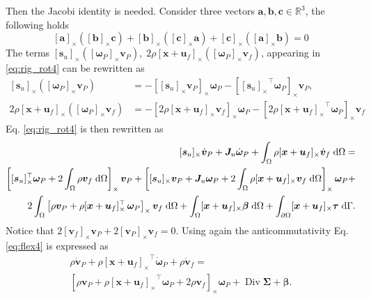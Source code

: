 \documentclass{svjour3}                     %
\DeclareMathOperator*{\Div}{Div}
\newcommand{\crmat}[1]{\ensuremath{[#1]_{\times}}}
\begin{document}
Then the Jacobi identity is needed. Consider three vectors $\bm{a}, \bm{b}, \bm{c} \in \mathbb{R}^3$, the following holds
\begin{equation}
\crmat{\bm{a}} (\crmat{\bm{b}} \bm{c}) + \crmat{\bm{b}} (\crmat{\bm{c}} \bm{a}) + \crmat{\bm{c}} (\crmat{\bm{a}} \bm{b}) = 0
\end{equation}
The terms $\crmat{\bm{s}_u} (\crmat{\bm{\omega}_P} \bm{v}_P), \; 2\rho \crmat{\bm{x}+\bm{u}_f} (\crmat{\bm\omega_P} {\bm{v}}_f)$, appearing in \eqref{eq:rig_rot4} can be rewritten as
\begin{align}
	\crmat{\bm{s}_u} (\crmat{\bm{\omega}_P} \bm{v}_P) &= - \crmat{\crmat{\bm{s}_u} \bm{v}_P} \bm{\omega}_P - \crmat{\crmat{\bm{s}_u}^\top \bm{\omega}_P} \bm{v}_P, \\
	2\rho \crmat{\bm{x}+\bm{u}_f} (\crmat{\bm\omega_P} {\bm{v}}_f) &= - \crmat{2\rho \crmat{\bm{x}+\bm{u}_f} \bm{v}_f} \bm\omega_P - \crmat{2\rho \crmat{\bm{x}+\bm{u}_f}^\top \bm\omega_P} \bm{v}_f
\end{align}
Eq. \eqref{eq:rig_rot4} is then rewritten as
\begin{equation}
\label{eq:rig_rot5}
\begin{split}
\crmat{\bm{s}_u} \dot{\bm{v}}_P  + \bm{J}_u \dot{\bm\omega}_P + \int_{\Omega} \rho \crmat{\bm{x}+\bm{u}_f} \dot{\bm{v}}_f \d{\Omega} = \\
\left[\crmat{\bm{s}_u}^\top \bm\omega_P + 2 \int_{\Omega} \rho \bm{v}_f \d{\Omega} \right]_\times \bm{v}_P + \left[\crmat{\bm{s}_u} \bm{v}_P + \bm{J}_u \bm\omega_P + 2 \int_{\Omega} \rho \crmat{\bm{x}+\bm{u}_f} {\bm{v}}_f \d{\Omega} \right]_\times \bm\omega_P + 
\\
2 \int_{\Omega} \left[\rho \bm{v}_P + \rho \crmat{\bm{x}+\bm{u}_f}^\top \, \bm\omega_P \right]_\times \bm{v}_f \d{\Omega} + \int_{\Omega}\crmat{\bm{x}+\bm{u}_f} \bm\beta \d{\Omega} + \int_{\partial \Omega}\crmat{\bm{x}+\bm{u}_f} \bm{\tau} \d{\Gamma}.
\end{split}
\end{equation}
Notice that $2 \crmat{\bm{v}_f}\bm{v}_P + 2 \crmat{\bm{v}_P}\bm{v}_f = 0$. Using again the anticommutativity Eq. \eqref{eq:flex4} is expressed as 
\begin{equation}
\label{eq:flex5}
\begin{split}
\rho \dot{\bm{v}}_P + \rho \crmat{\bm{x}+\bm{u}_f}^\top \dot{\bm\omega}_P  + \rho \dot{\bm{v}}_f = \\
\left[\rho \bm{v}_P + \rho \crmat{\bm{x}+\bm{u}_f}^\top \bm\omega_P + 2 \rho \bm{v}_f \right]_\times \bm\omega_P + \Div{\bm\Sigma} + \bm\beta.
\end{split}
\end{equation}
\end{document}

